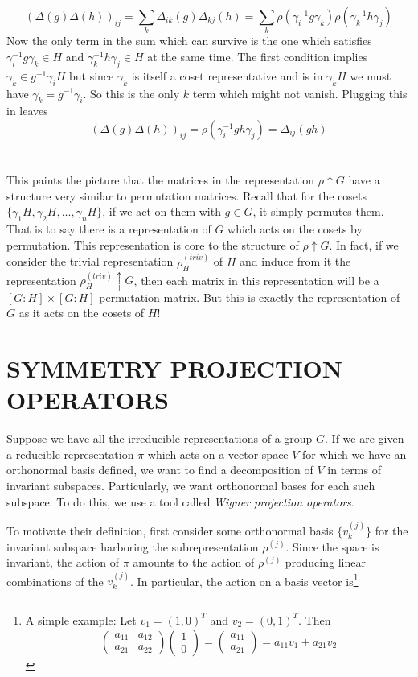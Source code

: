\documentclass[9 pt]{report}
\begin{document}
$$ \left(\Delta(g)\Delta(h)\right)_{ij} = \sum_k \Delta_{ik}(g)\Delta_{kj}(h) = \sum_{k} \rho(\gamma_i^{-1}g \gamma_k)\rho(\gamma_k^{-1}h\gamma_j)$$
Now the only term in the sum which can survive is the one which satisfies $\gamma_i^{-1}g \gamma_k\in H$ and $\gamma_k^{-1}h\gamma_j\in H$ at the same time. The first condition implies $\gamma_k \in g^{-1}\gamma_iH$ but since $\gamma_k$ is itself a coset representative and is in $\gamma_kH$ we must have $\gamma_k = g^{-1}\gamma_i$. So this is the only $k$ term which might not vanish. Plugging this in leaves
$$  \left(\Delta(g)\Delta(h)\right)_{ij} = \rho(\gamma_i^{-1}gh\gamma_j) = \Delta_{ij}(gh)$$
\\
\\
This paints the picture that the matrices in the representation $\rho\uparrow G$ have a structure very similar to permutation matrices. Recall that for the cosets $\{\gamma_1H, \gamma_2H, ... ,\gamma_nH\}$, if we act on them with $g\in G$, it simply permutes them. That is to say there is a representation of $G$ which acts on the cosets by permutation. This representation is core to the structure of $\rho\uparrow G$. In fact, if we consider the trivial representation $\rho^{(triv)}_H$ of $H$ and induce from it the representation $\rho^{(triv)}_H\uparrow G$, then each matrix in this representation will be a $[G:H]\times[G:H]$ permutation matrix. But this is exactly the representation of $G$ as it acts on the cosets of $H$!

\newpage



{\centering
\section*{SYMMETRY PROJECTION OPERATORS}}
Suppose we have all the irreducible representations of a group $G$. If we are given a reducible representation $\pi$ which acts on a vector space $V$ for which we have an orthonormal basis defined, we want to find a decomposition of $V$ in terms of invariant subspaces. Particularly, we want orthonormal bases for each such subspace. To do this, we use a tool called \emph{Wigner projection operators}. 

To motivate their definition, first consider some orthonormal basis $\{v^{(j)}_k\}$ for the invariant subspace harboring the subrepresentation $\rho^{(j)}$. Since the space is invariant, the action of $\pi$ amounts to the action of $\rho^{(j)}$ producing linear combinations of the $v^{(j)}_k$. In particular, the action on a basis vector is\footnote{A simple example: Let $v_1 = (1, 0)^T$ and $v_2 = (0, 1)^T$. Then
$$ \begin{pmatrix} 
a_{11} & a_{12} \\
 a_{21} & a_{22}
  \end{pmatrix}
  \begin{pmatrix}
  1\\
  0 
  \end{pmatrix}
  =
   \begin{pmatrix}
  a_{11}\\
  a_{21} 
  \end{pmatrix}=
  a_{11}v_1 + a_{21}v_2$$}
\end{document}

